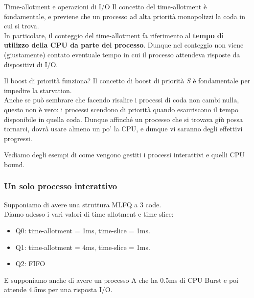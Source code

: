 \documentclass[12pt]{report}
\begin{document}
	\begin{osservazione}{Time-allotment e operazioni di I/O}{}
		Il concetto del time-allotment è fondamentale, e previene che un processo ad alta priorità monopolizzi la coda in cui si trova.\\
		In particolare, il conteggio del time-allotment fa riferimento al \textbf{tempo di utilizzo della CPU da parte del processo}. Dunque nel conteggio non viene (giustamente) contato eventuale tempo in cui il processo attendeva risposte da dispositivi di I/O.
	\end{osservazione}
	
	\begin{osservazione}{Il boost di priorità funziona?}{}
		Il concetto di boost di priorità $S$ è fondamentale per impedire la starvation.\\
		Anche se può sembrare che facendo risalire i processi di coda non cambi nulla, questo non è vero: i processi scendono di priorità quando esauriscono il tempo disponibile in quella coda. Dunque affinché un processo che si trovava giù possa tornarci, dovrà usare almeno un po' la CPU, e dunque vi saranno degli effettivi progressi.
	\end{osservazione}
	
	Vediamo degli esempi di come vengono gestiti i processi interattivi e quelli CPU bound.
	\subsubsection*{Un solo processo interattivo}
	Supponiamo di avere una struttura MLFQ a 3 code.\\
	Diamo adesso i vari valori di time allotment e time slice:
	\begin{itemize}
		\item Q0: time-allotment = 1ms, time-slice = 1ms.
		
		\item Q1: time-allotment = 4ms, time-slice = 1ms.
		
		\item Q2: FIFO
	\end{itemize}
	E supponiamo anche di avere un processo A che ha 0.5ms di CPU Burst e poi attende 4.5ms per una risposta I/O.
	
\end{document}
